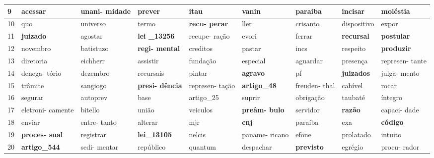 \begin{table}[h]
\begin{tabular}{|p{1cm}|m{1.5cm}|m{1.5cm}|m{1.5cm}|m{1.5cm}|m{1.5cm}|m{1.5cm}|m{1.5cm}|m{1.5cm}|}
    9 &  acessar & unani- \newline midade & prever & itau & vanin & paraiba & incisar & moléstia \\ \hline
    10 &  quo & universo & termo & \textbf{recu- \newline perar} & ller & crisanto & dispositivo & expor \\ \hline
    11 & \textbf{juizado} & agostar & \textbf{lei \newline \_13256} & recupe- \newline ração & evori & ferrar & \textbf{recursal} & \textbf{postular} \\ \hline
    12 &  novembro & batistuzo & \textbf{regi- \newline mental} & creditos & pastar & incs & respeito & \textbf{produzir} \\ \hline
    13 &  diretoria & eichherr & assistir & fundação & especial & aguardar & presença & represen- \newline tante \\ \hline
    14 &  denega- \newline tório & dezembro & recursais & pintar & \textbf{agravo} & pf & \textbf{juizados} & julga- \newline mento \\ \hline
    15 &  trâmite & sangiogo & \textbf{presi- \newline dência} & represen- \newline tação & \textbf{artigo\newline \_48} & freuden- \newline thal & cabível & rocar \\ \hline
    16 &  segurar & autoprev & base & artigo\newline\_25 & suprir & obrigação & taubaté & íntegro \\ \hline
    17 &  eletroni- \newline camente & bitello & união & veiculos & \textbf{preâm- \newline bulo} & servidor & \textbf{razão} & capaci- \newline dade \\ \hline
    18 &  enviar & entre- \newline tanto & alterar & mjr & \textbf{cnj} & paraíba & exa & \textbf{código} \\ \hline
    19 &  \textbf{proces- \newline sual} & registrar & \textbf{lei\newline\_13105} & nelcis & paname- \newline ricano & efone & prolatado & intuito \\ \hline
    20 &  \textbf{artigo\newline\_544} & sedi- \newline mentar & repúblico & quantum & despachar & \textbf{previsto} & egrégio & procu- \newline rador \\ \hline
  \end{tabular}
\end{table}